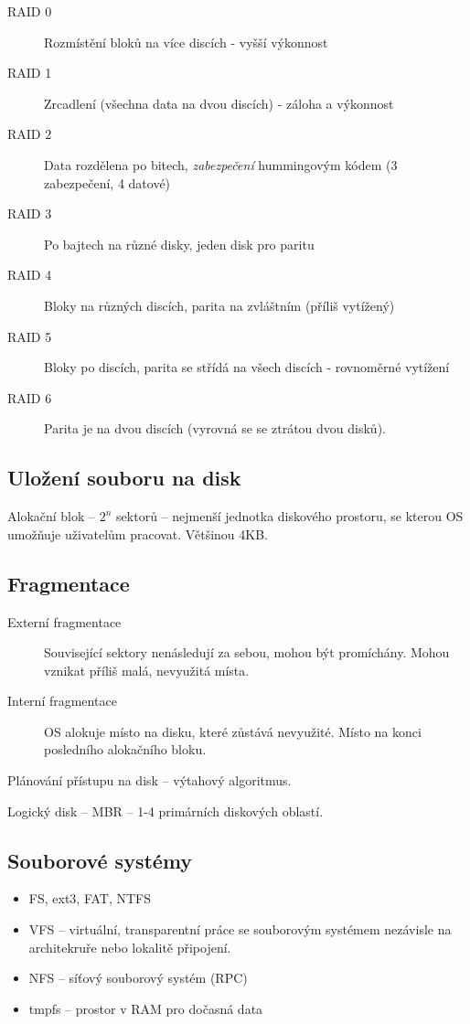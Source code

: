 \documentclass[a4paper, 11pt]{report}
\begin{document}
\begin{description}
	\item[RAID 0] Rozmístění bloků na více discích - vyšší výkonnost
	\item[RAID 1] Zrcadlení (všechna data na dvou discích) - záloha a výkonnost
	\item[RAID 2] Data rozdělena po bitech, \emph{zabezpečení} hummingovým kódem (3 zabezpečení, 4 datové)
	\item[RAID 3] Po bajtech na různé disky, jeden disk pro paritu
	\item[RAID 4] Bloky na různých discích, parita na zvláštním (příliš vytížený)
	\item[RAID 5] Bloky po discích, parita se střídá na všech discích - rovnoměrné vytížení
	\item[RAID 6] Parita je na dvou discích (vyrovná se se ztrátou dvou disků).
\end{description}

\subsection{Uložení souboru na disk}

Alokační blok -- $2^n$ sektorů -- nejmenší jednotka diskového prostoru, se kterou OS umožňuje uživatelům pracovat. Většinou 4KB.

\subsection{Fragmentace}
\begin{description}
	\item[Externí fragmentace] Související sektory nenásledují za sebou, mohou být promíchány. Mohou vznikat příliš malá, nevyužitá místa.
	\item[Interní fragmentace] OS alokuje místo na disku, které zůstává nevyužité. Místo na konci posledního alokačního bloku.
\end{description}

Plánování přístupu na disk -- výtahový algoritmus.

Logický disk -- MBR -- 1-4 primárních diskových oblastí.

\subsection{Souborové systémy}
\begin{itemize}
	\item FS, ext3, FAT, NTFS
	\item VFS -- virtuální, transparentní práce se souborovým systémem nezávisle na architekruře nebo lokalitě připojení.
	\item NFS -- síťový souborový systém (RPC)
	\item tmpfs -- prostor v RAM pro dočasná data
\end{itemize} 
\end{document}
